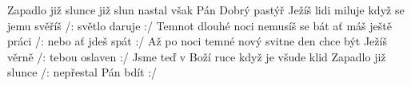 \begin{TEXT}{Zapadlo již slunce}
\SLOKA {} již slun  nastal  \NL
{} však    Pán  \NL\hspace*{5cm} 
\SLOKA Dobrý pastýř Ježíš lidi miluje \NL
když se jemu svěříš /: světlo daruje :/ 
\SLOKA Temnot dlouhé noci nemusíš se bát \NL
ať máš ještě práci /: nebo ať jdeš spát :/ 
\SLOKA Až po noci temné nový svitne den \NL
chce být Ježíš věrně /: tebou oslaven :/ 
\SLOKA Jsme teď v Boží ruce když je všude klid \NL
Zapadlo již slunce /: nepřestal Pán bdít :/ \NL
\end{TEXT}
